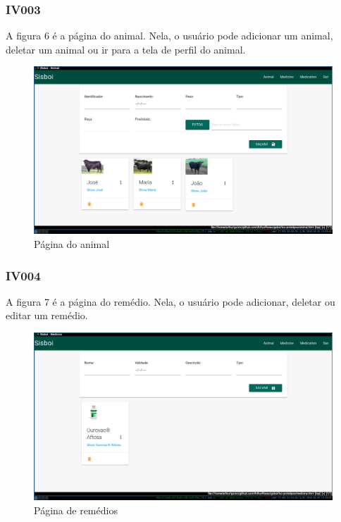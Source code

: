 \documentclass[12pt]{article}
\begin{document}
\newpage
\subsubsection{IV003}

A figura 6 é a página do animal. Nela, o usuário pode adicionar um animal, deletar um animal ou ir para a tela de perfil do animal.
\begin{figure}[!h]
	\begin{center}
		\caption{Página do animal}
		\includegraphics[width=13cm]{img/prototipos/animal.png}


	\end{center}
\end{figure}
\subsubsection{IV004}

A figura 7 é a página do remédio. Nela, o usuário pode adicionar, deletar ou editar um remédio.
\begin{figure}[!h]
	\begin{center}
		\caption{Página de remédios}
		\includegraphics[width=13cm]{img/prototipos/remedio.png}


	\end{center}
\end{figure}
\end{document}
